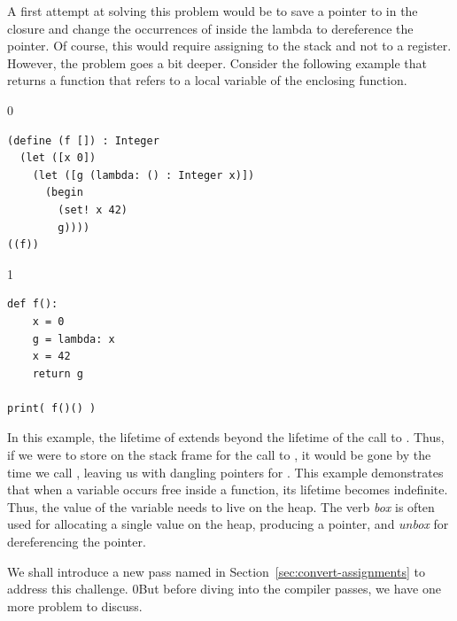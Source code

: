 \documentclass[7x10,nocrop]{TimesAPriori_MIT}%
\def\racketEd{0}
\def\pythonEd{1}
\def\edition{1}
\newcommand{\racket}[1]{{\if\edition\racketEd{#1}\fi}}
\begin{document}
A first attempt at solving this problem would be to save a pointer to
 in the closure and change the occurrences of  inside
the lambda to dereference the pointer. Of course, this would require
assigning  to the stack and not to a register. However, the
problem goes a bit deeper.
Consider the following example that returns a function that refers to
a local variable of the enclosing function.
\begin{center}
\begin{minipage}{\textwidth}
{\if\edition\racketEd

\begin{lstlisting}
(define (f []) : Integer
  (let ([x 0])
    (let ([g (lambda: () : Integer x)])
      (begin
        (set! x 42)
        g))))
((f))
\end{lstlisting}
\fi}
{\if\edition\pythonEd
\begin{lstlisting}
def f():
    x = 0
    g = lambda: x
    x = 42
    return g

print( f()() )
\end{lstlisting}
\fi}
\end{minipage}
\end{center}
In this example, the lifetime of  extends beyond the lifetime
of the call to . Thus, if we were to store  on the
stack frame for the call to , it would be gone by the time we
call , leaving us with dangling pointers for
. This example demonstrates that when a variable occurs free
inside a function, its lifetime becomes indefinite. Thus, the value of
the variable needs to live on the heap.  The verb
\emph{box} is often used for allocating a single
value on the heap, producing a pointer, and
\emph{unbox} for dereferencing the pointer.

We shall introduce a new pass named
 in Section~\ref{sec:convert-assignments}
to address this challenge.
%
\racket{But before diving into the compiler passes, we have one more
  problem to discuss.}
\end{document}

